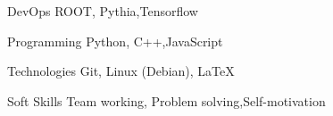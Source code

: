 

\begin{cvskills}

  \cvskill
    {DevOps} %
    {ROOT, Pythia,Tensorflow} %


  \cvskill
    {Programming} %
    { Python, C++,JavaScript} %

  \cvskill
    {Technologies} %
    { Git,  Linux (Debian), \LaTeX} %

      \cvskill
    {Soft Skills} %
    {Team working, Problem solving,Self-motivation} %


\end{cvskills}
